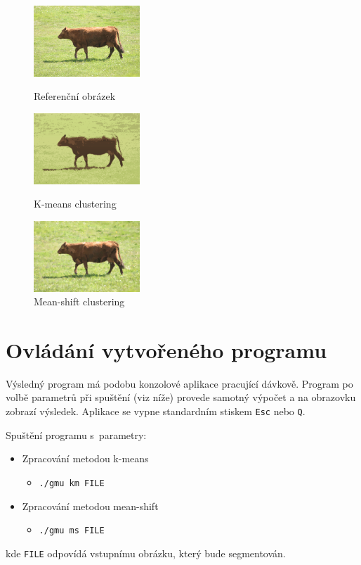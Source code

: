 \documentclass[11pt,a4paper]{article}
\begin{document}
\begin{figure}[ht]
        \begin{center}
            \includegraphics[width=4cm,keepaspectratio]{images/img.pdf}
        \end{center}
        \caption{Referenční obrázek}
    \endminipage
    \hfill
        \begin{center}
            \includegraphics[width=4cm,keepaspectratio]{images/km.pdf}
        \end{center}
        \caption{K-means clustering}
    \endminipage
    \hfill
        \begin{center}
            \includegraphics[width=4cm,keepaspectratio]{images/ms.pdf}
        \end{center}
        \caption{Mean-shift clustering}
    \endminipage
\end{figure}


\section{Ovládání vytvořeného programu}
Výsledný program má podobu konzolové aplikace pracující dávkově. Program po volbě parametrů při spuštění (viz níže) provede samotný výpočet a na obrazovku zobrazí výsledek. Aplikace se vypne standardním stiskem \texttt{Esc} nebo \texttt{Q}.

Spuštění programu s~parametry:
\begin{itemize}
  \item Zpracování metodou k-means 
    \begin{itemize}
      \item[] \texttt{./gmu km FILE}
    \end{itemize}
  \item Zpracování metodou mean-shift
    \begin{itemize}
      \item[] \texttt{./gmu ms FILE}
    \end{itemize}
\end{itemize}
kde \texttt{FILE} odpovídá vstupnímu obrázku, který bude segmentován.
\end{document}
